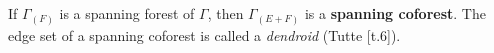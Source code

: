 If $\Gamma_{(F)}$ is a spanning forest of $\Gamma$, then $\Gamma_{(E+F)}$ is a \textbf{spanning coforest}. The edge set of a spanning coforest is called a \textit{dendroid} (Tutte [t.6]).